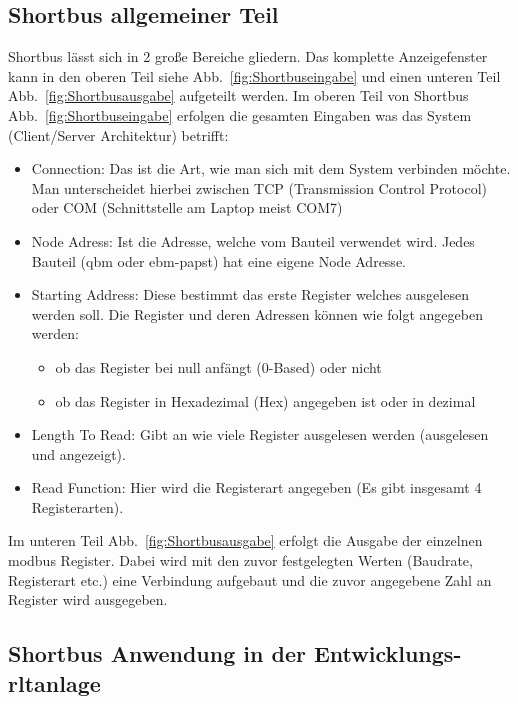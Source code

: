 \subsection{Shortbus allgemeiner Teil}
Shortbus lässt sich in 2 große Bereiche gliedern. Das komplette Anzeigefenster kann in den oberen Teil siehe Abb.~\ref{fig:Shortbuseingabe} und einen unteren Teil Abb.~\ref{fig:Shortbusausgabe} aufgeteilt werden.
Im oberen Teil von Shortbus Abb.~\ref{fig:Shortbuseingabe} erfolgen die gesamten Eingaben was das System (Client/Server Architektur) betrifft:
\begin{itemize}
	\item Connection: Das ist die Art, wie man sich mit dem System verbinden möchte. Man unterscheidet hierbei zwischen TCP (Transmission Control Protocol) oder COM (Schnittstelle am Laptop meist COM7)
	
	\item Node Adress: Ist die Adresse, welche vom Bauteil verwendet wird. Jedes Bauteil (\zB \gls{qbm}  oder ebm-papst) hat eine eigene Node Adresse.
	
	\item Starting Address: Diese bestimmt das erste Register welches ausgelesen werden soll. Die Register und deren Adressen können wie folgt angegeben werden:
		\begin{itemize}
			\item ob das Register bei null anfängt (0-Based) oder nicht
			\item ob das Register in Hexadezimal (Hex) angegeben ist oder in dezimal
		\end{itemize}
	\item Length To Read: Gibt an wie viele Register ausgelesen werden (ausgelesen und angezeigt).
	\item Read Function: Hier wird die Registerart angegeben (Es gibt insgesamt 4 Registerarten).
\end{itemize}

Im unteren Teil Abb.~\ref{fig:Shortbusausgabe} erfolgt die Ausgabe der einzelnen \gls{modbus} Register. Dabei wird mit den zuvor festgelegten Werten (Baudrate, Registerart etc.) eine Verbindung aufgebaut und die zuvor angegebene Zahl an Register wird ausgegeben. 


  

\subsection{Shortbus Anwendung in der Entwicklungs- \ac{rltanlage}}

